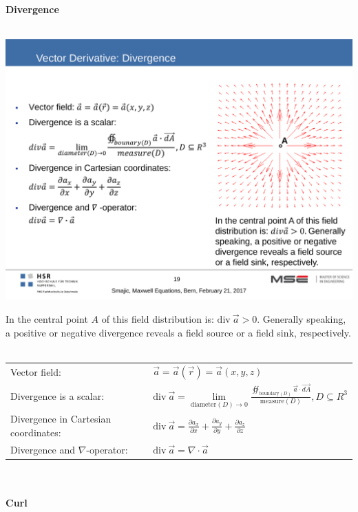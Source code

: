 \textbf{\\ \\ Divergence\\ \\}
\begin{minipage}[lt]{5cm}
	\includegraphics[width=.8\textwidth]{./images/Divergence.pdf}
\end{minipage}
\begin{minipage}[rt]{13cm}
	In the central point $A$ of this field distribution is: $\mathrm{div}~\vec{a} > 0$. Generally speaking, a positive or negative divergence reveals a field source or a field sink, respectively. \\ \\
	\begin{tabular}{ll}
		Vector field: & \(\displaystyle \vec{a} = \vec{a}\left(\vec{r}\right) = \vec{a}\left(x,y,z\right)\) \\
		Divergence is a scalar: & \(\displaystyle \mathrm{div}~\vec{a} = \lim\limits_{\textrm{diameter}\left(D\right)\rightarrow 0} \frac{\oiint_{\textrm{boundary}\left(D\right)} \vec{a} \cdot \vec{dA}}{\textrm{measure}\left(D\right)}, D\subseteq R^3\) \\
		Divergence in Cartesian coordinates: & \(\displaystyle \mathrm{div}~\vec{a} = \frac{\partial a_x}{\partial x} + \frac{\partial a_y}{\partial y} + \frac{\partial a_z}{\partial z} \)\\
		Divergence and $\nabla$-operator: & \(\displaystyle \mathrm{div}~\vec{a} = \nabla \cdot \vec{a} \) \\
	\end{tabular}
\end{minipage}
\newpage
\textbf{\\ \\ Curl\\ \\}
